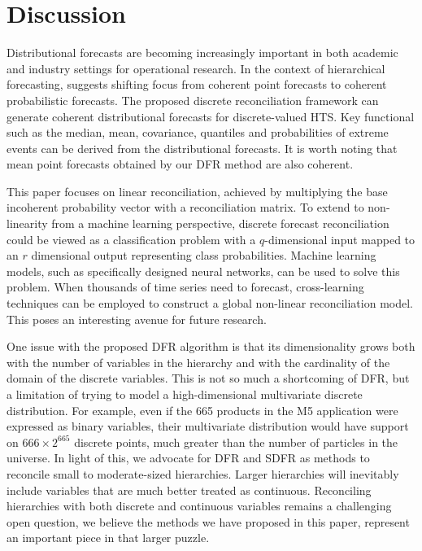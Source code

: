 \documentclass[a4paper,review,12pt,authoryear]{elsarticle}
\theoremstyle{definition}
\begin{document}
     \section{Discussion}
     \label{sec:discussion}



     Distributional forecasts are becoming increasingly important in both academic and industry settings for operational research. In the context of hierarchical forecasting, \cite{kolassaWeWantCoherent2022} suggests shifting focus from coherent point forecasts to coherent probabilistic forecasts.
     The proposed discrete reconciliation framework can generate coherent distributional forecasts for discrete-valued HTS.
     Key functional such as the median, mean, covariance, quantiles and probabilities of extreme events can be derived from the distributional forecasts.
     It is worth noting that mean point forecasts obtained by our DFR method are also coherent.


     This paper focuses on linear reconciliation, achieved by multiplying the base incoherent probability vector with a reconciliation matrix.
     To extend to non-linearity from a machine learning perspective, discrete forecast reconciliation could be viewed as a classification problem with a $q$-dimensional input mapped to an $ r$ dimensional output representing class probabilities. Machine learning models, such as specifically designed neural networks, can be used to solve this problem.
     When thousands of time series need to forecast, cross-learning techniques can be employed to construct a global non-linear reconciliation model. This poses an interesting avenue for future research.

     One issue with the proposed DFR algorithm is that its dimensionality grows both with the number of variables in the hierarchy and with the cardinality of the domain of the discrete variables. This is not so much a shortcoming of DFR, but a limitation of trying to model a high-dimensional multivariate discrete distribution. For example, even if the 665 products in the M5 application were expressed as binary variables, their multivariate distribution would have support on $666\times2^{665}$ discrete points, much greater than the number of particles in the universe. In light of this, we advocate for DFR and SDFR as methods to reconcile small to moderate-sized hierarchies. Larger hierarchies will inevitably include variables that are much better treated as continuous. Reconciling hierarchies with both discrete and continuous variables remains a challenging open question, we believe the methods we have proposed in this paper, represent an important piece in that larger puzzle.
     
\end{document}

